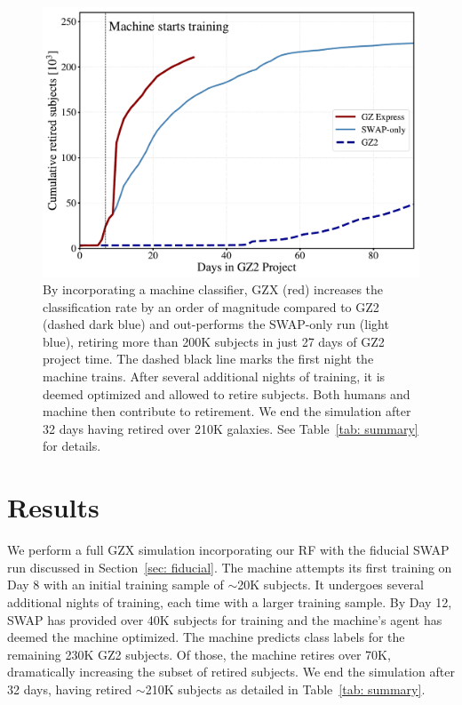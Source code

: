 \documentclass[twocolumn,  trackchanges, ]{aastex6}%
\begin{document}
\begin{figure}[t!]
\centering
\includegraphics[width=5.5in]{f10.pdf}
\caption{By incorporating a machine classifier, GZX (red) increases the classification rate by an order of magnitude compared to GZ2 (dashed dark blue) and out-performs the SWAP-only run (light blue), retiring more than 200K subjects in just 27 days of GZ2 project time. The dashed black line marks the first night the machine trains. After several additional nights of training, it is deemed optimized and allowed to retire subjects. Both humans and machine then contribute to retirement. We end the simulation after 32 days having retired over 210K galaxies. See Table~\ref{tab: summary} for details. \label{fig: money}}
\end{figure}


\section{Results} \label{sec: results}
We perform a full GZX simulation incorporating our RF with the fiducial SWAP run discussed in Section~\ref{sec: fiducial}. The machine attempts its first training on Day 8 with an initial training sample of $\sim$20K subjects. It undergoes several additional nights of training, each time with a larger training sample. By Day 12, SWAP has provided over 40K subjects for training and the machine's agent has deemed the machine optimized. The machine predicts class labels for the remaining 230K GZ2 subjects. Of those, the machine retires over 70K, dramatically increasing the subset of retired subjects. We end the simulation after 32 days, having retired $\sim$210K subjects as detailed in Table~\ref{tab: summary}. 
\end{document}
